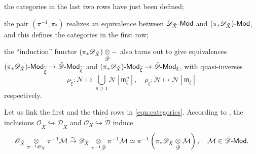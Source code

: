 \documentclass[12pt, a3paper, openany]{book}
\begin{document}
\begin{compactitem}
	\item the categories in the last two rows have just been defined;
	\item the pair $(\pi^{-1}, \pi_*)$ realizes an equivalence between $\mathscr{D}_{\tilde{X}} \text{-}\mathsf{Mod}$ and $(\pi_*\mathscr{D}_{\tilde{X}}) \text{-}\mathsf{Mod}$, and this defines the categories in the first row;
	\item the ``induction'' functor $(\pi_* \mathscr{D}_{\tilde{X}}) \underset{\tilde{\mathscr{D}}}{\otimes} -$ also turns out to give equivalences $(\pi_* \mathscr{D}_{\tilde{X}}) \text{-}\mathsf{Mod}_{\widetilde{\overline{\xi}}} \to \tilde{\mathscr{D}} \text{-}\mathsf{Mod}_{\widetilde{\xi}}$ and $(\pi_* \mathscr{D}_{\tilde{X}}) \text{-}\mathsf{Mod}_{\overline{\xi}} \to \tilde{\mathscr{D}} \text{-}\mathsf{Mod}_{\xi}$, with quasi-inverses
	\[ \rho_{\widetilde{\xi}}: \mathcal{N} \mapsto \bigcup_{n \geq 1} \mathcal{N}[\mathfrak{m}_\xi^n], \quad \rho_{\xi}: \mathcal{N} \mapsto \mathcal{N}[\mathfrak{m}_\xi] \]
	respectively.
\end{compactitem}

Let us link the first and the third rows in \eqref{eqn:categories}. According to \cite[1.8.9]{BB93}, the inclusions $\mathscr{O}_{\tilde{X}} \hookrightarrow \mathscr{D}_{\tilde{X}}$ and $\mathscr{O}_X \hookrightarrow \tilde{\mathscr{D}}$ induce
\begin{equation}\label{eqn:N-M}
	\mathscr{O}_{\tilde{X}} \underset{\pi^{-1} \mathscr{O}_X}{\otimes} \pi^{-1} \mathcal{M} \stackrel{\sim}{\rightarrow} \mathscr{D}_{\tilde{X}} \underset{\pi^{-1} \tilde{\mathscr{D}}}{\otimes} \pi^{-1} \mathcal{M} \simeq \pi^{-1}\left( \pi_* \mathscr{D}_{\tilde{X}} \underset{\tilde{\mathscr{D}}}{\otimes} \mathcal{M}  \right), \quad \mathcal{M} \in \tilde{\mathscr{D}}\text{-}\mathsf{Mod}.
\end{equation}
\end{document}

